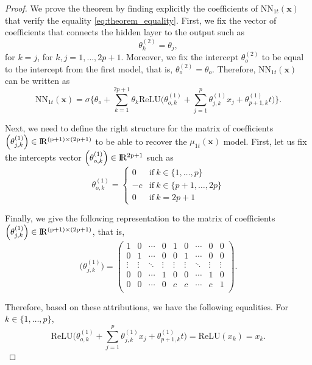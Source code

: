 \documentclass{article}
\def\x{\mathbf x}
\def \real{\rm I\!R}
\begin{document}
\begin{proof}
We prove the theorem by finding explicitly the coefficients of $\mathrm{NN}_{1t}(\x)$ that verify the equality \eqref{eq:theorem_equality}. First, we fix the vector of coefficients that connects the hidden layer to the output such as 
$$\theta_{k}^{(2)} = \theta_j,$$ 
for $k=j$, for $k,j=1,\ldots,2p+1$. Moreover, we fix the intercept $\theta_o^{(2)}$ to be equal to the intercept from the first model, that is, $\theta_o^{(2)} = \theta_o$. Therefore, $\mathrm{NN}_{1t}(\x)$ can be written as
\begin{equation}
    \mathrm{NN}_{1t}(\x) = \sigma \biggl\{ \theta_o + \sum_{k=1}^{2p+1} \theta_k  \mathrm{ReLU}\Big(\theta_{o,k}^{(1)} + \sum_{j=1}^{p} \theta_{j,k}^{(1)} x_j +  \theta_{p+1,k}^{(1)} t \Big)  \biggr\}.
    \label{eq:neural_network2_proof}
\end{equation}

Next, we need to define the right structure for the matrix of coefficients $\Big(\theta_{j,k}^{(1)}\Big) \in \real^{(p+1) \times (2p+1)}$ to be able to recover the $\mu_{1t}(\x)$ model. First, let us fix the intercepts vector $\Big(\theta_{o,k}^{(1)}\Big) \in \real^{2p+1}$ such as
\[ \theta_{o,k}^{(1)} = 
    \left\{ \begin{array}{cl}
      0 & \mathrm{if}~k \in \{1,\ldots,p\}\\
      -c & \mathrm{if}~k \in \{p+1, \ldots, 2p\}\\
      0 & \mathrm{if}~k=2p+1 
            \end{array} \right.
\]

Finally, we give the following representation to the matrix of coefficients $\Big(\theta_{j,k}^{(1)}\Big) \in \real^{(p+1) \times (2p+1)}$, that is,
\[ \Big(\theta_{j,k}^{(1)}\Big) = 
\left(
\begin{array}{cccc|cccc|c}
1 & 0 & \cdots & 0 & 1 & 0 & \cdots & 0 & 0  \\
0 & 1 & \cdots & 0 & 0 & 1 & \cdots & 0 & 0  \\
\vdots  & \vdots  & \ddots & \vdots & \vdots  & \vdots  & \ddots & \vdots & \vdots  \\
0 & 0 & \cdots & 1 & 0 & 0 & \cdots & 1 & 0  \\
\hline
0 & 0 & \cdots & 0 & c & c & \cdots & c & 1  \\
\end{array}
\right).
\]


Therefore, based on these attributions, we have the following equalities. For $k \in \{1, \ldots, p\}$, 
\begin{equation}
    \mathrm{ReLU}\Big(\theta_{o,k}^{(1)} + \sum_{j=1}^{p} \theta_{j,k}^{(1)} x_j +  \theta_{p+1,k}^{(1)} t \Big) = \mathrm{ReLU}(x_k) = x_k.
    \label{eq:1st_equality}
\end{equation}


\end{proof}
\end{document}
